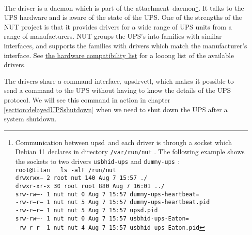 \documentclass[12pt]{article}
\newcommand{\ad}{\mbox{\textcolor{UPSDCOLOUR}{attachment daemon}}}
\newcommand{\upsd}{\mbox{\textcolor{UPSDCOLOUR}{upsd}}}
\newcommand{\upsdrvctl}{\mbox{\textcolor{UPSDCOLOUR}{upsdrvctl}}}
\newcommand{\HCL}{https://www.networkupstools.org/stable-hcl.html}
\begin{document}
The driver is a daemon which is part of the \ad\footnote{Communication
between \upsd\ and each driver is through a socket which Debian 11
declares in directory \texttt{/var/{\allowbreak}run/{\allowbreak}nut}
. The following example shows the sockets to two drivers
\texttt{usbhid-ups} and \texttt{dummy-ups} :\\
\hspace*{2cm}\texttt{root@titan ~ ls -alF /run/nut} \\
\hspace*{2cm}\texttt{drwxrwx---  2 root nut  140 Aug  7 15:57 ./} \\
\hspace*{2cm}\texttt{drwxr-xr-x 30 root root 880 Aug  7 16:01 ../} \\
\hspace*{2cm}\texttt{srw-rw----  1 nut  nut    0 Aug  7 15:57 dummy-ups-heartbeat=} \\
\hspace*{2cm}\texttt{-rw-r--r--  1 nut  nut    5 Aug  7 15:57 dummy-ups-heartbeat.pid} \\
\hspace*{2cm}\texttt{-rw-r--r--  1 nut  nut    5 Aug  7 15:57 upsd.pid} \\
\hspace*{2cm}\texttt{srw-rw----  1 nut  nut    0 Aug  7 15:57 usbhid-ups-Eaton=} \\
\hspace*{2cm}\texttt{-rw-r--r--  1 nut  nut    4 Aug  7 15:57 usbhid-ups-Eaton.pid}}.
It talks to the UPS hardware and is aware of the state of the UPS.
One of the strengths of the NUT project is that it provides drivers
for a wide range of UPS units from a range of manufacturers.  NUT
groups the UPS's into families with similar interfaces, and supports
the families with drivers which match the manufacturer's interface.
See \href{\HCL}{the hardware compatibility list} for a looong list of
the available drivers.

The drivers share a command interface, \upsdrvctl, which makes it possible to
send a command to the UPS without having to know the details of the UPS
protocol.  We will see this command in action in chapter
\ref{section:delayedUPSshutdown} when we need to shut down the UPS after a
system shutdown.

\end{document}
